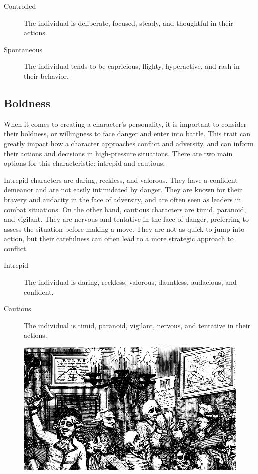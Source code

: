 \documentclass[12pt]{book}
\begin{document}
\begin{description}
    \item[Controlled] The individual is deliberate, focused, steady, and thoughtful in their actions.
    \item[Spontaneous] The individual tends to be capricious, flighty, hyperactive, and rash in their behavior.
\end{description}

\subsection{\textbf{Boldness}}

When it comes to creating a character's personality, it is important to consider their boldness, or willingness to face danger and enter into battle. This trait can greatly impact how a character approaches conflict and adversity, and can inform their actions and decisions in high-pressure situations. There are two main options for this characteristic: intrepid and cautious.

Intrepid characters are daring, reckless, and valorous. They have a confident demeanor and are not easily intimidated by danger. They are known for their bravery and audacity in the face of adversity, and are often seen as leaders in combat situations. On the other hand, cautious characters are timid, paranoid, and vigilant. They are nervous and tentative in the face of danger, preferring to assess the situation before making a move. They are not as quick to jump into action, but their carefulness can often lead to a more strategic approach to conflict.

\begin{description}
    \item[Intrepid] The individual is daring, reckless, valorous, dauntless, audacious, and confident.
    \item[Cautious] The individual is timid, paranoid, vigilant, nervous, and tentative in their actions.
\end{description}

\begin{figure}[h]
    \centering
    \includegraphics[width=\textwidth]{./images/personality05.pdf}
\end{figure}
\end{document}
